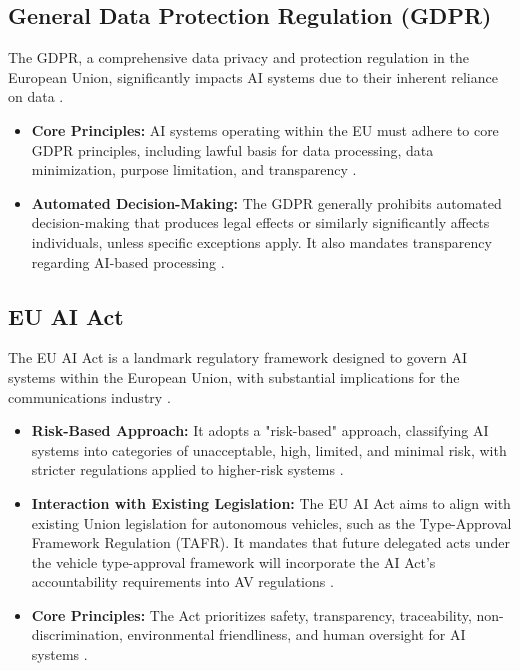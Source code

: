 \subsection{General Data Protection Regulation (GDPR)}
The GDPR, a comprehensive data privacy and protection regulation in the European Union, significantly impacts AI systems due to their inherent reliance on data \cite{Securiti_GDPR}.
\begin{itemize}
    \item \textbf{Core Principles:} AI systems operating within the EU must adhere to core GDPR principles, including lawful basis for data processing, data minimization, purpose limitation, and transparency \cite{EuropaEU_GDPR}.
    \item \textbf{Automated Decision-Making:} The GDPR generally prohibits automated decision-making that produces legal effects or similarly significantly affects individuals, unless specific exceptions apply. It also mandates transparency regarding AI-based processing \cite{Securiti_GDPR_2, IAPP_GDPR}.
\end{itemize}

\subsection{EU AI Act}
The EU AI Act is a landmark regulatory framework designed to govern AI systems within the European Union, with substantial implications for the communications industry \cite{Junecom_EU_AI_Act}.
\begin{itemize}
    \item \textbf{Risk-Based Approach:} It adopts a "risk-based" approach, classifying AI systems into categories of unacceptable, high, limited, and minimal risk, with stricter regulations applied to higher-risk systems \cite{Junecom_EU_AI_Act}.
    \item \textbf{Interaction with Existing Legislation:} The EU AI Act aims to align with existing Union legislation for autonomous vehicles, such as the Type-Approval Framework Regulation (TAFR). It mandates that future delegated acts under the vehicle type-approval framework will incorporate the AI Act's accountability requirements into AV regulations \cite{TaylorWessing_EU_AI_Act, TwoBirds_EU_AI_Act}.
    \item \textbf{Core Principles:} The Act prioritizes safety, transparency, traceability, non-discrimination, environmental friendliness, and human oversight for AI systems \cite{EuropaEU_EU_AI_Act}.
\end{itemize}


